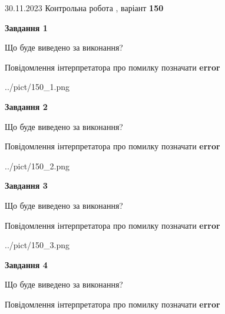 \documentclass[12pt, ukrainian]{article}
\begin{document}
{{30.11.2023 Контрольна робота , варіант  \No \textbf { 150 }\par}}
{




{\begin {center}\textbf{Завдання 1}\end {center}}\par
Що буде виведено за виконання? \par
Повідомлення інтерпретатора про помилку позначати \textbf{error}

\begin{center}
	{../pict/150_1.png}
\end{center}
\newpage

{\begin {center}\textbf{Завдання 2}\end {center}}\par
Що буде виведено за виконання? \par
Повідомлення інтерпретатора про помилку позначати \textbf{error}

\begin{center}
	{../pict/150_2.png}
\end{center}
\newpage

{\begin {center}\textbf{Завдання 3}\end {center}}\par
Що буде виведено за виконання? \par
Повідомлення інтерпретатора про помилку позначати \textbf{error}

\begin{center}
	{../pict/150_3.png}
\end{center}
\newpage

{\begin {center}\textbf{Завдання 4}\end {center}}\par
Що буде виведено за виконання? \par
Повідомлення інтерпретатора про помилку позначати \textbf{error}

}
\end{document}
